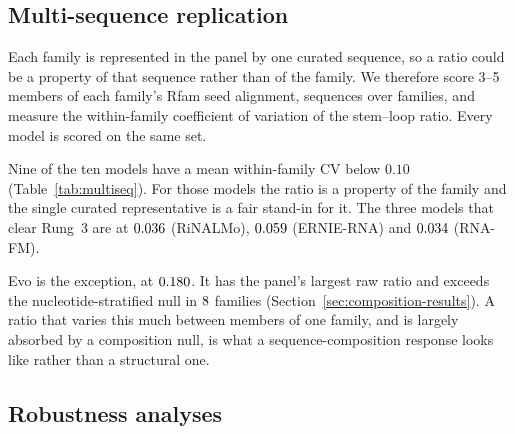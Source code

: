 \documentclass[11pt]{article}
\begin{document}
\subsection{Multi-sequence replication}
\label{sec:multiseq-results}

Each family is represented in the panel by one curated sequence, so a ratio
could be a property of that sequence rather than of the family. We therefore
score 3--5 members of each family's Rfam seed alignment, \multiseqN{} sequences
over \multiseqFamilies{} families, and measure the within-family coefficient of
variation of the stem--loop ratio. Every model is scored on the same set.



Nine of the ten models have a mean within-family CV below $0.10$
(Table~\ref{tab:multiseq}). For those models the ratio is a property of the
family and the single curated representative is a fair stand-in for it. The
three models that clear Rung~3 are at $0.036{}$ (RiNALMo),
$0.059{}$ (ERNIE-RNA) and $0.034{}$ (RNA-FM).

Evo is the exception, at $0.180{}$. It has the panel's largest raw ratio and
exceeds the nucleotide-stratified null in $8{}$ families
(Section~\ref{sec:composition-results}). A ratio that varies this much between
members of one family, and is largely absorbed by a composition null, is
what a sequence-composition response looks like rather than a structural one.

\subsection{Robustness analyses}
\label{sec:robustness}
\end{document}

